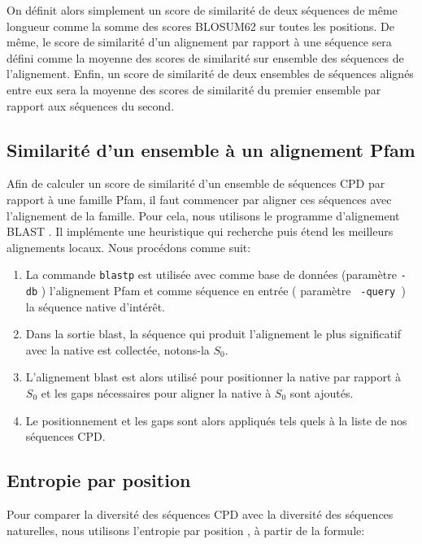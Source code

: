 On définit alors simplement un score de similarité de deux séquences de même longueur comme la somme des scores BLOSUM62 sur toutes les positions. De même, le score de similarité d'un alignement par rapport à une séquence sera défini comme la moyenne des scores de similarité sur ensemble des séquences de l'alignement. Enfin, un score de similarité de deux ensembles de séquences alignés entre eux sera la moyenne des scores de similarité du premier ensemble par rapport aux séquences du second.  

\subsection{Similarité d'un ensemble à un alignement Pfam}
\label{SimPfam}
Afin de calculer un score de similarité d'un ensemble de séquences CPD par rapport à une famille Pfam, il faut commencer par aligner ces séquences avec l'alignement de la famille. Pour cela, nous utilisons le programme d'alignement BLAST \cite{Altschul97,Camacho08}. Il implémente une heuristique qui recherche puis étend les meilleurs alignements locaux. Nous procédons comme suit:
\begin{enumerate}[leftmargin=*]
\item La commande \verb!blastp! est utilisée avec comme base de données (paramètre \verb!-db! ) l'alignement Pfam et comme séquence en entrée ( paramètre \verb! -query !) la séquence native d'intérêt. 
\item Dans la sortie blast, la séquence qui produit l'alignement le plus significatif avec la native est collectée, notons-la $S_0$. 
\item L'alignement blast est alors utilisé pour positionner la native par rapport à $S_0$ et les gaps nécessaires pour aligner la native à $S_0$ sont ajoutés.
\item Le positionnement et les gaps sont alors appliqués tels quels à la liste de nos séquences CPD.

\end{enumerate}

\subsection{Entropie par position}
\label{sec:Entropie}
Pour comparer la diversité des séquences CPD avec la diversité des séquences naturelles, nous utilisons l'entropie par position \cite{DurbinBK}, à partir de la formule:

